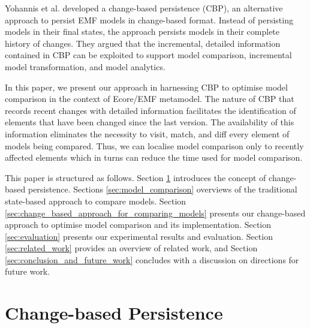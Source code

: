 \documentclass{llncs}
\begin{document}
Yohannis et al.\cite{DBLP:conf/models/YohannisKP17,yohannis2018towards,DBLP:conf/models/YohannisRPK18} developed a change-based persistence (CBP), an alternative approach to persist EMF models \cite{steinberg2008emf} in change-based format. Instead of persisting models in their final states, the approach persists models in their complete history of changes. They argued that the incremental, detailed information contained in CBP can be exploited to support model comparison, incremental model transformation, and model analytics.

In this paper, we present our approach in harnessing CBP to optimise model comparison in the context of Ecore/EMF metamodel. The nature of CBP that records recent changes with detailed information facilitates the identification of elements that have been changed since the last version. The availability of this information eliminates the necessity to visit, match, and diff every element of models being compared. Thus, we can localise model comparison only to recently affected elements which in turns can reduce the time used for model comparison.

This paper is structured as follows. Section \ref{sec:change-based_persistence} introduces the concept of change-based persistence. Sections \ref{sec:model_comparison} overviews of the traditional state-based approach to compare models. Section \ref{sec:change_based_approach_for_comparing_models} presents our change-based approach to optimise model comparison and its implementation. Section \ref{sec:evaluation} presents our experimental results and evaluation. Section \ref{sec:related_work} provides an overview of related work, and Section \ref{sec:conclusion_and_future_work} concludes with a discussion on directions for future work.

\vspace{-10pt}
\section{Change-based Persistence}
\label{sec:change-based_persistence}
\end{document}
